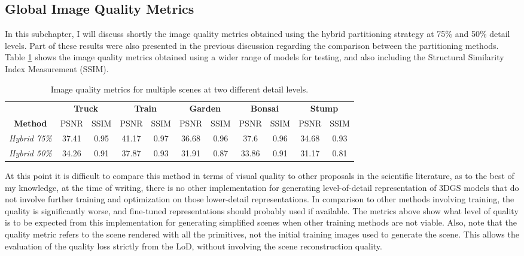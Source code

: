 \subsection{Global Image Quality Metrics}
In this subchapter, I will discuss shortly the image quality metrics obtained using the hybrid partitioning strategy at 75\% and 50\% detail levels. Part of these results were also presented in the previous discussion regarding the comparison between the partitioning methods. Table \ref{tab:quality} shows the image quality metrics obtained using a wider range of models for testing, and also including the Structural Similarity Index Measurement (SSIM).

\begin{table}[H]
\begin{tabular}{ccccccccccc}
                                          & \multicolumn{2}{c}{\textbf{Truck}} & \multicolumn{2}{c}{\textbf{Train}} & \multicolumn{2}{c}{\textbf{Garden}} & \multicolumn{2}{c}{\textbf{Bonsai}} & \multicolumn{2}{c}{\textbf{Stump}} \\
\multicolumn{1}{c|}{\textbf{Method}}      & PSNR   & \multicolumn{1}{c|}{SSIM} & PSNR   & \multicolumn{1}{c|}{SSIM} & PSNR   & \multicolumn{1}{c|}{SSIM}  & PSNR   & \multicolumn{1}{c|}{SSIM}  & PSNR             & SSIM            \\ \hline
\multicolumn{1}{c|}{\textit{Hybrid 75\%}} & 37.41  & \multicolumn{1}{c|}{0.95} & 41.17  & \multicolumn{1}{c|}{0.97} & 36.68  & \multicolumn{1}{c|}{0.96}  & 37.6   & \multicolumn{1}{c|}{0.96}  & 34.68            & 0.93            \\ \hline
\multicolumn{1}{c|}{\textit{Hybrid 50\%}} & 34.26  & \multicolumn{1}{c|}{0.91} & 37.87  & \multicolumn{1}{c|}{0.93} & 31.91  & \multicolumn{1}{c|}{0.87}  & 33.86  & \multicolumn{1}{c|}{0.91}  & 31.17            & 0.81           
\end{tabular}
\caption{Image quality metrics for multiple scenes at two different detail levels.}
\label{tab:quality}
\end{table}

At this point it is difficult to compare this method in terms of visual quality to other proposals in the scientific literature, as to the best of my knowledge, at the time of writing, there is no other implementation for generating level-of-detail representation of 3DGS models that do not involve further training and optimization on those lower-detail representations. In comparison to other methods involving training, the quality is significantly worse, and fine-tuned representations should probably used if available. The metrics above show what level of quality is to be expected from this implementation for generating simplified scenes when other training methods are not viable. Also, note that the quality metric refers to the scene rendered with all the primitives, not the initial training images used to generate the scene. This allows the evaluation of the quality loss strictly from the LoD, without involving the scene reconstruction quality.

